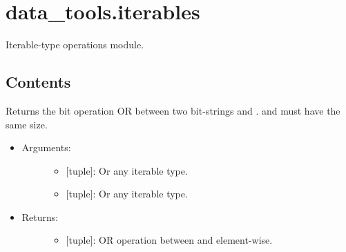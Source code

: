\documentclass[letterpaper,10pt,english]{sphinxmanual}
\begin{document}
\label{\detokenize{iterables:module-data_tools.iterables}}

\section{data\_tools.iterables}
\label{\detokenize{iterables:data-tools-iterables}}\label{\detokenize{iterables::doc}}
Iterable-type operations module.


\subsection{Contents}
\label{\detokenize{iterables:contents}}

\begin{fulllineitems}
\label{\detokenize{iterables:data_tools.iterables.bit_or}}
Returns the bit operation OR between two bit-strings  and .
  and  must have the same size.
\begin{itemize}
\item {} \begin{description}
\item[{Arguments:}] \leavevmode\begin{itemize}
\item {} 
 {[}tuple{]}: Or any iterable type.

\item {} 
 {[}tuple{]}: Or any iterable type.

\end{itemize}

\end{description}

\item {} \begin{description}
\item[{Returns:}] \leavevmode\begin{itemize}
\item {} 
{[}tuple{]}: OR operation between  and  element-wise.

\end{itemize}


\end{description}
\end{itemize}
\end{fulllineitems}
\end{document}
